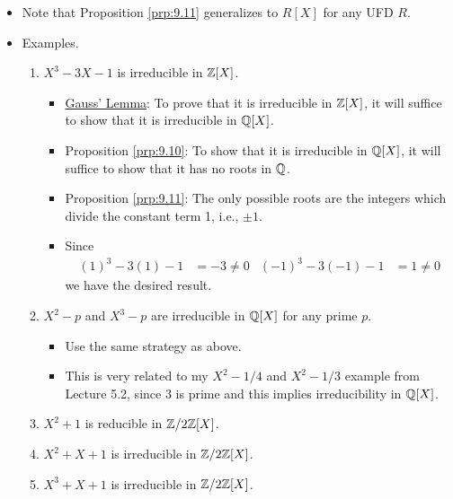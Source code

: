 \documentclass[../notes.tex]{subfiles}
\begin{document}
\begin{itemize}
\begin{proposition}
\begin{align*}
        \end{align*}
        In particular, if $p$ is a monic polynomial with integer coefficients and $p(d)\neq 0$ for all integers $d$ dividing the constant term of $p$, then $p$ has no roots in $\Q$.
        \begin{proof}
            Given (also related to the "Factorization by monomials" discussion from Lecture 5.2).
        \end{proof}
    \end{proposition}
    \item Note that Proposition \ref{prp:9.11} generalizes to $R[X]$ for any UFD $R$.
    \item Examples.
    \begin{enumerate}
        \item $X^3-3X-1$ is irreducible in $\mathbb{Z}[X]$.
        \begin{itemize}
            \item \hyperref[prp:9.5]{Gauss' Lemma}: To prove that it is irreducible in $\mathbb{Z}[X]$, it will suffice to show that it is irreducible in $\mathbb{Q}[X]$.
            \item Proposition \ref{prp:9.10}: To show that it is irreducible in $\mathbb{Q}[X]$, it will suffice to show that it has no roots in $\Q$.
            \item Proposition \ref{prp:9.11}: The only possible roots are the integers which divide the constant term 1, i.e., $\pm 1$.
            \item Since
            \begin{align*}
                (1)^3-3(1)-1 &= -3 \neq 0&
                (-1)^3-3(-1)-1 &= 1 \neq 0
            \end{align*}
            we have the desired result.
        \end{itemize}
        \item $X^2-p$ and $X^3-p$ are irreducible in $\mathbb{Q}[X]$ for any prime $p$.
        \begin{itemize}
            \item Use the same strategy as above.
            \item This is very related to my $X^2-1/4$ and $X^2-1/3$ example from Lecture 5.2, since 3 is prime and this implies irreducibility in $\mathbb{Q}[X]$.
        \end{itemize}
        \item $X^2+1$ is reducible in $\mathbb{Z}/2\mathbb{Z}[X]$.
        \item $X^2+X+1$ is irreducible in $\mathbb{Z}/2\mathbb{Z}[X]$.
        \item $X^3+X+1$ is irreducible in $\mathbb{Z}/2\mathbb{Z}[X]$.

\end{enumerate}
\end{itemize}
\end{document}
